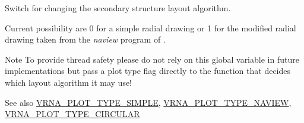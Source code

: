 Switch for changing the secondary structure layout algorithm. 

Current possibility are 0 for a simple radial drawing or 1 for the modified radial drawing taken from the {\itshape naview} program of \cite{bruccoleri:1988}.

\begin{DoxyNote}{Note}
To provide thread safety please do not rely on this global variable in future implementations but pass a plot type flag directly to the function that decides which layout algorithm it may use!
\end{DoxyNote}
\begin{DoxySeeAlso}{See also}
\hyperlink{group__plotting__utils_gae6d17b9f0a53cf5205a9181e0f8422e9}{V\+R\+N\+A\+\_\+\+P\+L\+O\+T\+\_\+\+T\+Y\+P\+E\+\_\+\+S\+I\+M\+P\+LE}, \hyperlink{group__plotting__utils_ga94d4c863ecac2f220f76658afb92f964}{V\+R\+N\+A\+\_\+\+P\+L\+O\+T\+\_\+\+T\+Y\+P\+E\+\_\+\+N\+A\+V\+I\+EW}, \hyperlink{group__plotting__utils_ga8c9eac631348da92136c8363ecdd9fb9}{V\+R\+N\+A\+\_\+\+P\+L\+O\+T\+\_\+\+T\+Y\+P\+E\+\_\+\+C\+I\+R\+C\+U\+L\+AR} 
\end{DoxySeeAlso}
